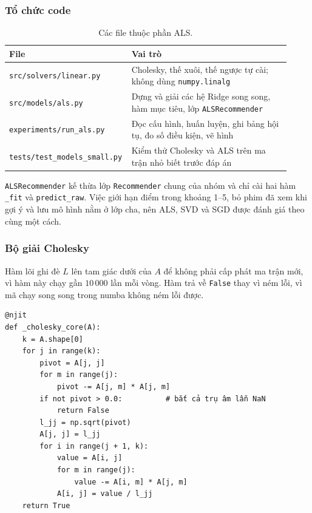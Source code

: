 \subsubsection{Tổ chức code}

\begin{table}[H]
  \centering
  \caption{Các file thuộc phần ALS.}
  \label{tab:als-files}
  \begin{tabular}{p{0.36\linewidth}>{\raggedright\arraybackslash}p{0.56\linewidth}}
    \hline
    File & Vai trò \\
    \hline
    \texttt{src/solvers/linear.py} & Cholesky, thế xuôi, thế ngược tự cài; không dùng \texttt{numpy.linalg} \\
    \texttt{src/models/als.py} & Dựng và giải các hệ Ridge song song, hàm mục tiêu, lớp \texttt{ALSRecommender} \\
    \texttt{experiments/run\_als.py} & Đọc cấu hình, huấn luyện, ghi bảng hội tụ, đo số điều kiện, vẽ hình \\
    \texttt{tests/test\_models\_small.py} & Kiểm thử Cholesky và ALS trên ma trận nhỏ biết trước đáp án \\
    \hline
  \end{tabular}
\end{table}

\texttt{ALSRecommender} kế thừa lớp \texttt{Recommender} chung của nhóm và chỉ cài hai hàm
\texttt{\_fit} và \texttt{predict\_raw}. Việc giới hạn điểm trong khoảng 1--5, bỏ phim đã xem khi gợi ý
và lưu mô hình nằm ở lớp cha, nên ALS, SVD và SGD được đánh giá theo cùng một cách.

\subsubsection{Bộ giải Cholesky}

Hàm lõi ghi đè $L$ lên tam giác dưới của $A$ để không phải cấp phát ma trận mới, vì hàm này chạy
gần $10\,000$ lần mỗi vòng. Hàm trả về \texttt{False} thay vì ném lỗi, vì mã chạy song song trong numba
không ném lỗi được.
\begin{verbatim}
@njit
def _cholesky_core(A):
    k = A.shape[0]
    for j in range(k):
        pivot = A[j, j]
        for m in range(j):
            pivot -= A[j, m] * A[j, m]
        if not pivot > 0.0:          # bắt cả trụ âm lẫn NaN
            return False
        l_jj = np.sqrt(pivot)
        A[j, j] = l_jj
        for i in range(j + 1, k):
            value = A[i, j]
            for m in range(j):
                value -= A[i, m] * A[j, m]
            A[i, j] = value / l_jj
    return True
\end{verbatim}

